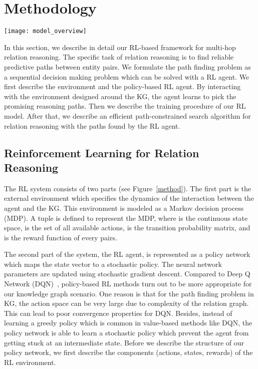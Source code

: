 \documentclass[11pt,letterpaper]{article}
\begin{document}
\section{Methodology}
\label{sec:methodology}
\begin{figure*}
\texttt{[image: model\_overview]}
\caption{Overview of our RL model. \textbf{Left:} The KG environment  modeled by a MDP. The dotted arrows (partially) show the existing relation links in the KG and the bold arrows show the reasoning paths found by the RL agent.  denotes the inverse of an relation. \textbf{Right:} The structure of the policy network agent. At each step, by interacting with the environment, the agent learns to pick a relation link to extend the reasoning paths.}
\label{method}
\end{figure*}

In this section, we describe in detail our RL-based framework for multi-hop relation reasoning. The specific task of relation reasoning is to find reliable predictive paths between entity pairs. We formulate the path finding problem as a sequential decision making problem which can be solved with a RL agent. We first describe the environment and the policy-based RL agent. By interacting with the environment designed around the KG, the agent learns to pick the promising reasoning paths. Then we describe the training procedure of our RL model. After that, we describe an efficient path-constrained search algorithm for  relation reasoning with the paths found by the RL agent.
\subsection{Reinforcement Learning for Relation Reasoning}
The RL system consists of two parts (see Figure~\ref{method}). The first part is the external environment  which specifies the dynamics of the interaction between the agent and the KG. This environment is modeled as a Markov decision process (MDP). A tuple  is defined to represent the MDP, where  is the continuous state space,  is the set of all available actions,  is the transition probability matrix, and  is the reward function of every  pairs. 

The second part of the system, the RL agent, is represented as a policy network  which maps the state vector to a stochastic policy. The neural network parameters  are updated using stochastic gradient descent. Compared to Deep Q Network (DQN)~\cite{Mnih}, policy-based RL methods turn out to be more appropriate for our knowledge graph scenario. One reason is that for the path finding problem in KG, the action space can be very large due to complexity of the relation graph. This can lead to poor convergence properties for DQN. Besides, instead of learning a greedy policy which is common in value-based methods like DQN, the policy network is able to learn a stochastic policy which prevent the agent from getting stuck at an intermediate state. Before we describe the structure of our policy network, we first describe the components (actions, states, rewards) of the RL environment.
\\
\end{document}

